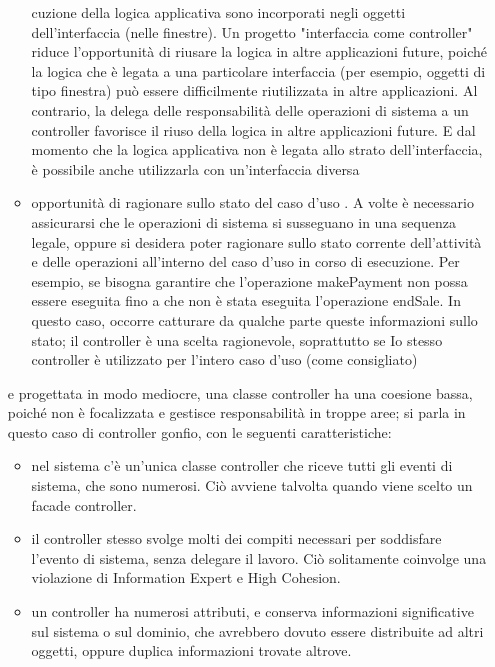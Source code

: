 \documentclass[a4paper,12pt, oneside]{book}
\begin{document}
\begin{enumerate}
\begin{itemize}
cuzione della logica applicativa sono incorporati negli oggetti dell'interfaccia (nelle
finestre). Un progetto "interfaccia come controller" riduce l'opportunità di riusare
la logica in altre applicazioni future, poiché la logica che è legata a una particolare
interfaccia (per esempio, oggetti di tipo finestra) può essere difficilmente riutilizzata in altre applicazioni. Al contrario, la delega delle responsabilità delle operazioni
di sistema a un controller favorisce il riuso della logica in altre applicazioni future.
E dal momento che la logica applicativa non è legata allo strato dell'interfaccia, è
possibile anche utilizzarla con un'interfaccia diversa
\item opportunità di ragionare sullo stato del caso d'uso . A volte è necessario assicurarsi
che le operazioni di sistema si susseguano in una sequenza legale, oppure si desidera
poter ragionare sullo stato corrente dell'attività e delle operazioni all'interno del caso d'uso in corso di esecuzione. Per esempio, se bisogna garantire che l'operazione
makePayment non possa essere eseguita fino a che non è stata eseguita l'operazione
endSale. In questo caso, occorre catturare da qualche parte queste informazioni
sullo stato; il controller è una scelta ragionevole, soprattutto se Io stesso controller è
utilizzato per l'intero caso d'uso (come consigliato)
\end{itemize}
e progettata in modo mediocre, una classe controller ha una coesione bassa, poiché non
è focalizzata e gestisce responsabilità in troppe aree; si parla in questo caso di controller
gonfio, con le seguenti caratteristiche:
\begin{itemize}
\item nel sistema c'è un'unica classe controller che riceve tutti gli eventi di sistema, che
sono numerosi. Ciò avviene talvolta quando viene scelto un facade controller.
\item il controller stesso svolge molti dei compiti necessari per soddisfare l'evento di
sistema, senza delegare il lavoro. Ciò solitamente coinvolge una violazione di Information Expert e High Cohesion.
\item un controller ha numerosi attributi, e conserva informazioni significative sul sistema o sul dominio, che avrebbero dovuto essere distribuite ad altri oggetti, oppure
duplica informazioni trovate altrove.
\end{itemize}


\end{enumerate}
\end{document}
